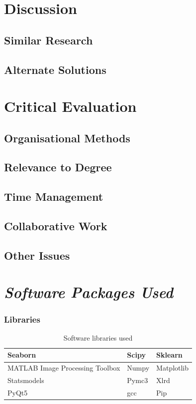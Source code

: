 \documentclass[11pt]{report}
\begin{document}
\clearpage
\chapter{Discussion}
\label{sec:orgaf2cd6d}
\section{Similar Research}
\label{sec:orgac71193}
\section{Alternate Solutions}
\label{sec:org8f72396}
\chapter{Critical Evaluation}
\label{sec:orgab68691}
\section{Organisational Methods}
\label{sec:orge1e68e9}
\section{Relevance to Degree}
\label{sec:org6c88ba0}
\section{Time Management}
\label{sec:org61ad6e7}
\section{Collaborative Work}
\label{sec:orgd161a7a}
\section{Other Issues}
\label{sec:orgdafb8d9}


\appendix
\chapter{\emph{Software Packages Used}}
\label{sec:org61f156f}
\subsection{Libraries}
\label{sec:orga522113}
\begin{table}[htbp]
\caption{\label{tab:org3bc3147}
Software libraries used}
\centering
\begin{tabularx}{\textwidth}{|X|X|X|}
\hline
Seaborn & Scipy & Sklearn\\
\hline
MATLAB Image Processing Toolbox & Numpy & Matplotlib\\
\hline
Statsmodels & Pymc3 & Xlrd\\
\hline
PyQt5 & gcc & Pip\\
\hline
\end{tabularx}
\end{table}
\end{document}
